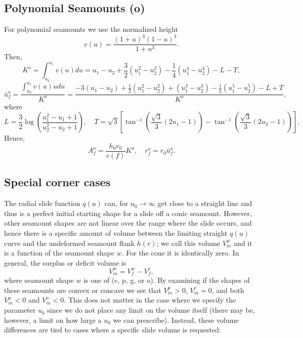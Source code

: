 \documentclass[12pt,letterpaper,margin=0.5in]{report}
\begin{document}
\subsection{Polynomial Seamounts (o)}

For polynomial seamounts we use the normalized height
\begin{equation}
v(u) = \frac{(1 + u)^3 (1 - u)^3}{1 + u^3}.
\end{equation}
Then,
\begin{equation}
K^o = \int_{u_2}^{u_1} v(u) du = u_1 - u_2 + \frac{3}{2}\left (u_1^2 - u_2^2 \right ) - \frac{1}{4} \left (u_1^4 - u_2^4\right ) - L - T,
\end{equation}
\begin{equation}
\bar{u}_f^o = \frac{\int_{u_2}^{u_1} v(u) u du}{K^o} = \frac{- 3 (u_1 - u_2) + \frac{1}{2}(u_1^2 - u_2^2) + (u_1^3 - u_2^3) - \frac{1}{5}(u_1^5 - u_2^5) - L + T}{K^o},
\end{equation}
where 
\begin{equation}
L = \frac{3}{2} \log \left ( \frac{u_1^2 - u_1 + 1}{u_2^2 - u_2 + 1}\right ), \quad T = \sqrt{3} \left [ \tan^{-1} \left (\frac{\sqrt{3}}{3}(2u_1 - 1)\right ) - \tan^{-1} \left (\frac{\sqrt{3}}{3}(2u_2 - 1)\right )\right ].
\end{equation}
Hence,
\begin{equation}
A_f^o = \frac{h_0 r_0}{v(f)} K^o, \quad r_f^o = r_0\bar{u}_f^o.
\end{equation}

\subsection{Special corner cases}

The radial slide function $q(u)$ can, for $u_0 \rightarrow \infty$ get close to a straight line and thus is a perfect
initial starting shape for a slide off a conic seamount.  However, other seamount shapes are not linear over the range where the slide
occurs, and hence there is a specific amount of volume between the limiting straight $q(u)$ curve and the undeformed seamount
flank $h(r)$; we call this volume $V_m^w$ and it is a function of the seamount shape $w$.  For the cone it is identically zero.
In general, the surplus or deficit volume is
\begin{equation}
V_m^w = V_f^w - V_f^c,
\end{equation}
where seamount shape $w$ is one of (c, p, g, or o).  By examining if the shapes of these seamounts are convex or concave
we see that $V_m^p > 0$, $V_m^c = 0$, and both $V_m^g < 0$ and $V_m^o < 0$. This does not matter in the case where we
specify the parameter $u_0$ since we do not place any limit on the volume itself (there may be, however, a limit on
how large a $u_0$ we can prescribe). Instead, these volume differences are tied to cases where a specific slide volume is requested:
\end{document}
